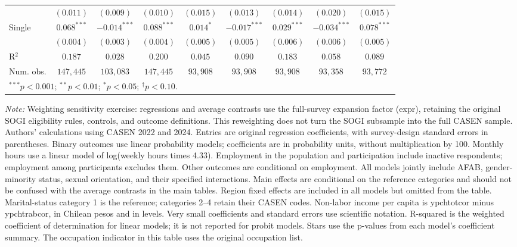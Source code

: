 \begin{table}[htpb]
{\begin{tabular}{l c c c c c c c c}
 & $(0.011)$ & $(0.009)$ & $(0.010)$ & $(0.015)$ & $(0.013)$ & $(0.014)$ & $(0.020)$ & $(0.015)$ \\
Single & $0.068^{***}$ & $-0.014^{***}$ & $0.088^{***}$ & $0.014^{*}$ & $-0.017^{***}$ & $0.029^{***}$ & $-0.034^{***}$ & $0.078^{***}$ \\
 & $(0.004)$ & $(0.003)$ & $(0.004)$ & $(0.005)$ & $(0.005)$ & $(0.006)$ & $(0.006)$ & $(0.005)$ \\
\hline
R$^2$ & $0.187$ & $0.028$ & $0.200$ & $0.045$ & $0.090$ & $0.183$ & $0.058$ & $0.089$ \\
Num. obs. & $147,445$ & $103,083$ & $147,445$ & $93,908$ & $93,908$ & $93,908$ & $93,358$ & $93,772$ \\
\hline
\multicolumn{9}{l}{\scriptsize $^{***}p<0.001$; $^{**}p<0.01$; $^{*}p<0.05$; $^{\dagger}p<0.10$.} \\
\end{tabular}%
}
\par\smallskip
\begin{minipage}{\textwidth}\footnotesize\raggedright
\textit{Note:} Weighting sensitivity exercise: regressions and average contrasts use the full-survey expansion factor (expr), retaining the original SOGI eligibility rules, controls, and outcome definitions. This reweighting does not turn the SOGI subsample into the full CASEN sample. Authors' calculations using CASEN 2022 and 2024. Entries are original regression coefficients, with survey-design standard errors in parentheses. Binary outcomes use linear probability models; coefficients are in probability units, without multiplication by 100. Monthly hours use a linear model of log(weekly hours times 4.33). Employment in the population and participation include inactive respondents; employment among participants excludes them. Other outcomes are conditional on employment. All models jointly include AFAB, gender-minority status, sexual orientation, and their specified interactions. Main effects are conditional on the reference categories and should not be confused with the average contrasts in the main tables. Region fixed effects are included in all models but omitted from the table. Marital-status category 1 is the reference; categories 2--4 retain their CASEN codes. Non-labor income per capita is ypchtotcor minus ypchtrabcor, in Chilean pesos and in levels. Very small coefficients and standard errors use scientific notation. R-squared is the weighted coefficient of determination for linear models; it is not reported for probit models. Stars use the p-values from each model's coefficient summary. The occupation indicator in this table uses the original occupation list.
\end{minipage}
\end{table}
